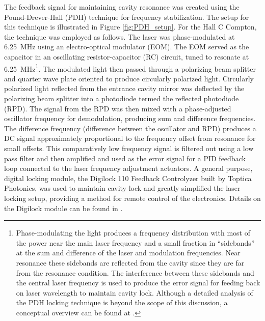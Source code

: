 The feedback signal for maintaining cavity resonance was created using the Pound-Drever-Hall (PDH) technique for frequency stabilization. The setup for this technique is illustrated in Figure \ref{fig:PDH_setup}. For the Hall C Compton, the technique was employed as follows. The laser was phase-modulated at 6.25~MHz using an electro-optical modulator (EOM). The EOM served as the capacitor in an oscillating resistor-capacitor (RC) circuit, tuned to resonate at 6.25~MHz\footnote{Phase-modulating the light produces a frequency distribution with most of the power near the main laser frequency and a small fraction in ``sidebands'' at the sum and difference of the laser and modulation frequencies. Near resonance these sidebands are reflected from the cavity since they are far from the resonance condition. The interference between these sidebands and the central laser frequency is used to produce the error signal for feeding back on laser wavelength to maintain cavity lock. Although a detailed analysis of the PDH locking technique is beyond the scope of this discussion, a conceptual overview can be found at \cite{Black}.}. The modulated light then passed through a polarizing beam splitter and quarter wave plate oriented to produce circularly polarized light. Circularly polarized light reflected from the entrance cavity mirror was deflected by the polarizing beam splitter into a photodiode termed the reflected photodiode (RPD). The signal from the RPD was then mixed with a phase-adjusted oscillator frequency for demodulation, producing sum and difference frequencies. The difference frequency (difference between the oscillator and RPD) produces a DC signal approximately proportional to the frequency offset from resonance for small offsets. This comparatively low frequency signal is filtered out using a low pass filter and then amplified and used as the error signal for a PID feedback loop connected to the laser frequency adjustment actuators. A general purpose, digital locking module, the Digilock 110 Feedback Controlyzer built by Toptica Photonics, was used to maintain cavity lock and greatly simplified the laser locking setup, providing a method for remote control of the electronics. Details on the Digilock module can be found in \cite{Digilock}. 
